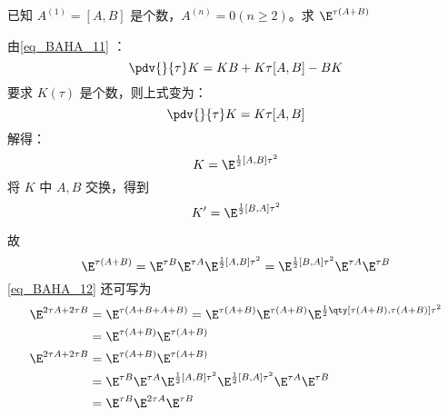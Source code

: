 \begin{example}{}
已知 $A^{(1)}=[A,B]$ 是个数，$A^{(n)}=0(n\geq 2)$。求 $\E^{\tau(A+B)}$

由\autoref{eq_BAHA_11} ：
\begin{equation}
\pdv{}{\tau}K=KB+K\tau[A,B]-BK
\end{equation}
要求 $K(\tau)$ 是个数，则上式变为：
\begin{equation}
\pdv{}{\tau}K=K\tau[A,B]
\end{equation}
解得：
\begin{equation}
K=\E^{\frac{1}{2}[A,B]\tau^2}
\end{equation}
将 $K$ 中 $A,B$ 交换，得到 
\begin{equation}
K'=\E^{\frac{1}{2}[B,A]\tau^2}
\end{equation}

故
\begin{equation}\label{eq_BAHA_12}
\E^{\tau(A+B)}=\E^{\tau B}\E^{\tau A}\E^{\frac{1}{2}[A,B]\tau^2}=\E^{\frac{1}{2}[B,A]\tau^2}\E^{\tau A}\E^{\tau B}
\end{equation}
\autoref{eq_BAHA_12} 还可写为
\begin{equation}
\begin{aligned}
\E^{2\tau A+2\tau B}&=\E^{\tau(A+B+A+B)}=\E^{\tau (A+B)}\E^{\tau (A+B)}\E^{\frac{1}{2}\qty[\tau(A+B),\tau(A+B)]\tau^2}\\
&=\E^{\tau(A+B)}\E^{\tau(A+B)}\\
\E^{2\tau A+2\tau B}&=\E^{\tau(A+B)}\E^{\tau(A+B)}\\
&=\E^{\tau B}\E^{\tau A}\E^{\frac{1}{2}[A,B]\tau^2}\E^{\frac{1}{2}[B,A]\tau^2}\E^{\tau A}\E^{\tau B}\\
&=\E^{\tau B}\E^{2\tau A}\E^{\tau B}
\end{aligned}
\end{equation}
\end{example}
